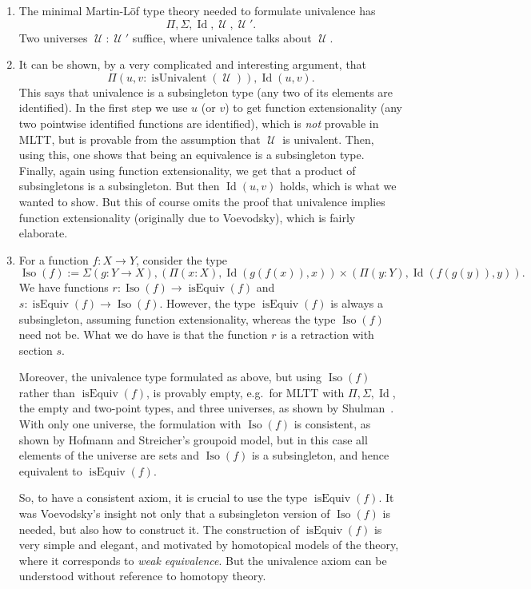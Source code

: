 \documentclass{article}
\newcommand{\Id}{\operatorname{Id}}
\newcommand{\U}{\operatorname{\mathcal{U}}}
\newcommand{\isEquiv}{\operatorname{isEquiv}}
\newcommand{\isUnivalent}{\operatorname{isUnivalent}}
\newcommand{\Iso}{\operatorname{Iso}}
\begin{document}
\begin{enumerate}
\item 
 The minimal Martin-L\"of type theory needed to formulate univalence
    has
    \[
      \Pi, \Sigma, \Id, \U, \U'.
    \]
    Two universes $\U :\U'$ suffice, where univalence talks about $\U$.
  
\item It can be shown, by a very complicated and interesting argument,
    that
    \[
     \Pi(u,v: \isUnivalent(\U)), \Id(u,v).
   \]
    This says that univalence is a subsingleton type (any two of its
    elements are identified). In the first step we use $u$ (or $v$) to get
    function extensionality (any two pointwise identified functions
    are identified), which is \emph{not} provable in MLTT, but is provable
    from the assumption that $\U$ is univalent. Then, using this, one
    shows that being an equivalence is a subsingleton type. Finally,
    again using function extensionality, we get that a product of
    subsingletons is a subsingleton. But then $\Id(u,v)$ holds, which is
    what we wanted to show. But this of course omits the proof that
    univalence implies function extensionality (originally due to
    Voevodsky), which is fairly elaborate.

 \item For a function $f:X\to Y$, consider the type
   \[
     \Iso(f) := \Sigma(g:Y\to X), (\Pi(x:X), \Id(g(f(x)),x)) \times  (\Pi(y:Y), \Id(f(g(y)),y)).
   \]
    We have functions $r:\Iso(f)\to \isEquiv(f)$ and
    $s:\isEquiv(f)\to \Iso(f)$. However, the type $\isEquiv(f)$ is always a
    subsingleton, assuming function extensionality, whereas the type
    $\Iso(f)$ need not be. What we do have is that the function $r$ is a
    retraction with section $s$.

    Moreover, the univalence type formulated as above, but using
    $\Iso(f)$ rather than $\isEquiv(f)$, is provably empty, e.g.\ for
    MLTT with $\Pi, \Sigma, \Id$, the empty and two-point types, and
    three universes, as shown by Shulman~\cite{shulman:e46}. With only
    one universe, the formulation with $\Iso(f)$ is consistent, as
    shown by Hofmann and Streicher's groupoid model, but in this case
    all elements of the universe are sets and $\Iso(f)$ is a
    subsingleton, and hence equivalent to $\isEquiv(f)$.
    
    So, to have a consistent axiom, it is crucial to use the type
    $\isEquiv(f)$. It was Voevodsky's insight not only that a
    subsingleton version of $\Iso(f)$ is needed, but also how to
    construct it. The construction of $\isEquiv(f)$ is very simple and
    elegant, and motivated by homotopical models of the theory, where
    it corresponds to \emph{weak equivalence}. But the univalence
    axiom can be understood without reference to homotopy theory.


\end{enumerate}
\end{document}
